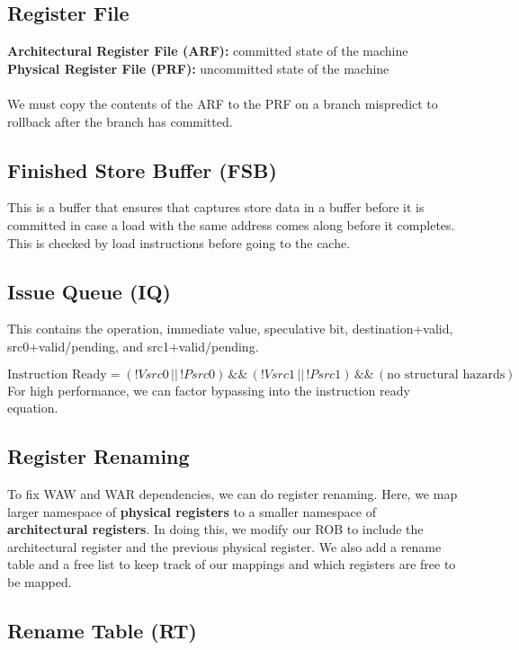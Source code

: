 \documentclass{article}
\begin{document}
\subsection{Register File}
\textbf{Architectural Register File (ARF):} committed state of the machine \\
\textbf{Physical Register File (PRF):} uncommitted state of the machine \\
\\
We must copy the contents of the ARF to the PRF on a branch mispredict to rollback after the branch has committed.

\subsection{Finished Store Buffer (FSB)}
This is a buffer that ensures that captures store data in a buffer before it is committed in case a load with the same address comes along before it completes. This is checked by load instructions before going to the cache.

\subsection{Issue Queue (IQ)}
This contains the operation, immediate value, speculative bit, destination+valid, src0+valid/pending, and src1+valid/pending.

$$ \text{Instruction Ready} = (!Vsrc0 \, || \, !Psrc0) \, \&\& \, (!Vsrc1 \, || \, !Psrc1) \, \&\& \, (\text{no structural hazards}) $$
For high performance, we can factor bypassing into the instruction ready equation.

\subsection{Register Renaming}

To fix WAW and WAR dependencies, we can do register renaming. Here, we map larger namespace of \textbf{physical registers} to a smaller namespace of \textbf{architectural registers}. In doing this, we modify our ROB to include the architectural register and the previous physical register. We also add a rename table and a free list to keep track of our mappings and which registers are free to be mapped.

\subsection{Rename Table (RT)}
\end{document}
